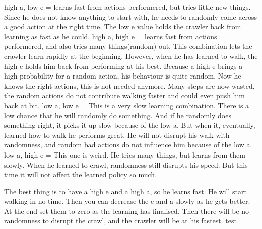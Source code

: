 high a, low e = learns fast from actions performered, but tries little new things.
Since he does not know anything to start with, he needs to randomly come across a good action at the right time.
The low e value holds the crawler back from learning as fast as he could.
high a, high e = learns fast from actions performered, and also tries many things(random) out.
This combination lets the crawler learn rapidly at the beginning. However, when he has learned to walk, the high e
holds him back from performing at his best. Because a high e brings a high probability for a random action, his
behaviour is quite random. Now he knows the right actions, this is not needed anymore. Many steps are now wasted, the random
actions do not contribute walking faster and could even push him back at bit.
low a, low e = This is a very slow learning combination. There is a low chance that he will randomly do something.
And if he randomly does something right, it picks it up slow because of the low a. But when it, eventually, learned how to walk
he performs great. He will not disrupt his walk with randomness, and random bad actions do not influence him because of
the low a.
low a, high e = This one is weird. He tries many things, but learns from them slowly. When he learned to crawl, randomness
still disrupts his speed. But this time it will not affect the learned policy so much.

The best thing is to have a high e and a high a, so he learns fast. He will start walking in no time. Then you can decrease
the e and a slowly as he gets better. At the end set them to zero as the learning has finalised. Then there will be no
randomness to disrupt the crawl, and the crawler will be at his fastest.
test